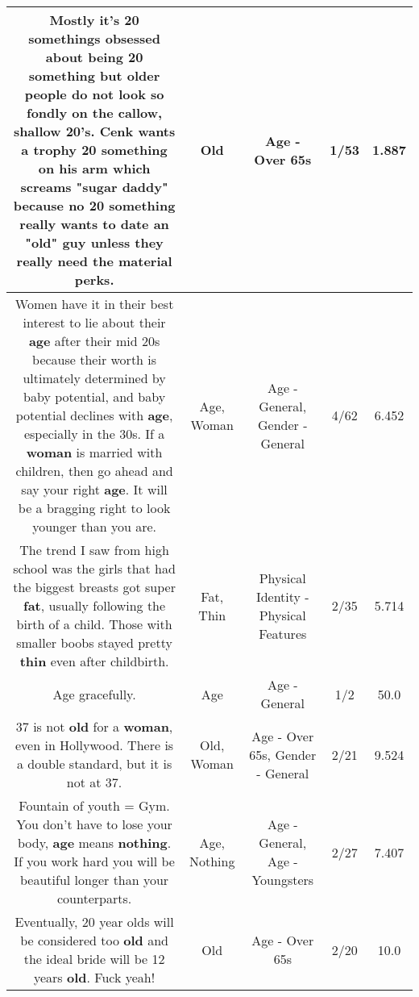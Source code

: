 \documentclass[11pt]{article}
\newlength\mylength
\begin{document}
\begin{center}
\begin{longtable}{|C{.65\mylength}|C{.30\mylength}|C{.12\mylength}|C{.12\mylength}|C{.12\mylength}|}
  \small Mostly it's 20 somethings obsessed about being 20 something but  older people do not look so fondly on the callow, shallow 20's.  Cenk wants a trophy 20 something on his arm which screams "sugar daddy" because no 20 something really wants to date an "\textbf{old}" guy unless they really need the material perks.\normalsize   & Old & Age - Over 65s & 1/53 & 1.887 \\  \hline
  \small Women have it in their best interest to lie about their \textbf{age} after their mid 20s because their worth is ultimately determined by baby potential, and baby potential declines with \textbf{age}, especially in the 30s. If a \textbf{woman} is married with children, then go ahead and say your right \textbf{age}. It will be a bragging right to look younger than you are.\normalsize   & Age, Woman & Age - General, Gender - General & 4/62 & 6.452 \\  \hline
  \small The trend I saw from high school was the girls that had the biggest breasts got super \textbf{fat}, usually following the birth of a child.  Those with smaller boobs stayed pretty \textbf{thin} even after childbirth.\normalsize   & Fat, Thin & Physical Identity - Physical Features & 2/35 & 5.714 \\  \hline
  \small Age gracefully.\normalsize   & Age & Age - General & 1/2 & 50.0 \\  \hline
  \small 37 is not \textbf{old} for a \textbf{woman}, even in Hollywood.  There is a double standard, but it is not at 37.\normalsize   & Old, Woman & Age - Over 65s, Gender - General & 2/21 & 9.524 \\  \hline
  \small Fountain of youth = Gym. You don't have to lose your body, \textbf{age} means \textbf{nothing}. If you work hard you will be beautiful longer than your counterparts.\normalsize   & Age, Nothing & Age - General, Age - Youngsters & 2/27 & 7.407 \\  \hline
  \small Eventually, 20 year olds will be considered too \textbf{old} and the ideal bride will be 12 years \textbf{old}. Fuck yeah!\normalsize   & Old & Age - Over 65s & 2/20 & 10.0 \\  \hline

\end{longtable}
\end{center}
\end{document}
